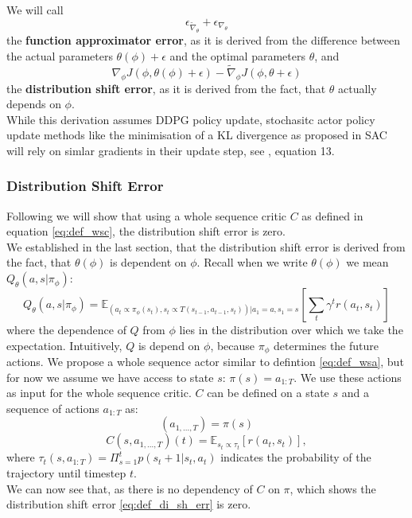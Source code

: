 We will call 
\begin{equation}
    \label{eq:def_func_app_err}
     \epsilon_{\widetilde{\nabla}_{\theta}} + \epsilon_{\nabla_{\theta}}
\end{equation}
the \textbf{function approximator error}, as it is derived from the difference between 
the actual parameters $\theta(\phi) +\epsilon$ and the optimal parameters $\theta$, and \\
\begin{equation}
    \label{eq:def_di_sh_err}
    \nabla_{\phi} J(\phi, \theta(\phi) + \epsilon) - \widetilde{\nabla}_\phi J(\phi, \theta + \epsilon)
\end{equation}
the \textbf{distribution shift error}, as it is derived from the fact, that $\theta$ actually depends on $\phi$. \\
While this derivation assumes DDPG policy update, stochasitc actor policy update methods like the minimisation of a KL divergence as 
proposed in SAC will rely on simlar gradients in their update step, see \cite{haarnoja2018soft}, equation 13.

\subsubsection{Distribution Shift Error}
\label{dist_shift_error_section}
Following we will show that using a whole sequence critic $C$ as defined in equation \ref{eq:def_wsc}, the distribution shift error is zero. \\ 

We established in the last section, that the distribution shift error is derived from the fact, that $\theta(\phi)$ is dependent on $\phi$. 
Recall when we write $\theta(\phi)$ we mean $Q_{\theta}(a,s|\pi_{\phi})$:
\begin{equation*}
    Q_{\theta}(a,s|\pi_{\phi}) = \mathbb{E}_{(a_t \propto \pi_{\phi}(s_t), s_t \propto T(s_{t-1}, a_{t-1}, s_t))|a_1=a, s_1=s}\left[\sum_t \gamma^t r(a_t, s_t)\right]
\end{equation*}
where the dependence of $Q$ from $\phi$ lies in the distribution over which we take the expectation. Intuitively, $Q$ is depend on $\phi$, because $\pi_{\phi}$ determines the 
future actions. We propose a whole sequence actor similar to defintion \ref{eq:def_wsa}, but for now we assume we have access to state $s$: $\pi(s) = a_{1:T}$. 
We use these actions as input for the whole sequence critic. 
$C$ can be defined on a state $s$ and a 
sequence of actions $a_{1:T}$ as: 
\begin{equation*}
    (a_{1,...,T}) = \pi(s)
\end{equation*}
\begin{equation}
    C(s, a_{1,...,T})(t) = \mathbb{E}_{s_t \propto \tau_t}\left[r(a_t, s_t)\right],
\end{equation}
where $\tau_t(s, a_{1:T}) =  \Pi_{s=1}^t p(s_t+1|s_t, a_t)$ indicates the probability of the trajectory until timestep $t$. \\
We can now see that, as there is no dependency of $C$ on $\pi$, which shows the distribution shift error \ref{eq:def_di_sh_err} is zero. 

